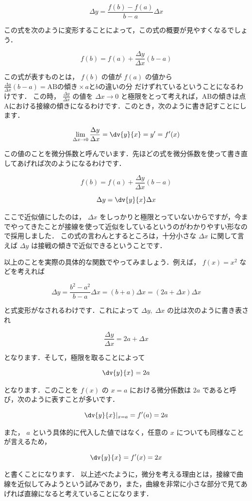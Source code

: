 \documentclass[
  letterpaper,
  DIV=11,
  numbers=noendperiod]{scrreprt}
\begin{document}
\[\Delta y = \frac{f(b)-f(a)}{b-a} \Delta x\]

この式を次のように変形することによって，この式の概要が見やすくなるでしょう．

\[ f(b) = f(a) + \frac{\Delta y}{\Delta x}(b-a) \]

この式が表すものとは， \(f(b)\) の値が \(f(a)\) の値から
\(\frac{\Delta y}{\Delta x}(b-a)=\text{ABの傾き}\times a\text{と}b\text{の違いの分}\)
だけずれているということになるわけです． この時，
\(\frac{\Delta y}{\Delta x}\) の値を \(\Delta x\to 0\)
と極限をとって考えれば，ABの傾きは点Aにおける接線の傾きになるわけです．このとき，次のように書き記すことにします．

\[\lim_{\Delta x \to 0}\frac{\Delta y}{\Delta x}=\dv{y}{x}=y'=f'(x)\]

この値のことを微分係数と呼んでいます．先ほどの式を微分係数を使って書き直してあげれば次のようになるわけです．

\[ f(b) = f(a) + \frac{\Delta y}{\Delta x}(b-a) \]

\[ \Delta y = \dv{y}{x} \Delta x\]

ここで近似値にしたのは， \(\Delta x\)
をしっかりと極限とっていないからですが，今までやってきたことが接線を使って近似をしているというのがわかりやすい形なので採用しました．
この式の言わんとするところは，十分小さな \(\Delta x\) に関して言えば
\(\Delta y\) は接戦の傾きで近似できるということです．

以上のことを実際の具体的な関数でやってみましょう．例えば， \(f(x)=x^2\)
などを考えれば

\[\Delta y = \frac{b^2-a^2}{b-a} \Delta x = (b+a) \Delta x = (2a+\Delta x) \Delta x\]

と式変形がなされるわけです．これによって \(\Delta y,\; \Delta x\)
の比は次のように書き表され

\[\frac{\Delta y}{\Delta x} = 2a + \Delta x\]

となります．そして，極限を取ることによって

\[\dv{y}{x}=2a\]

となります．このことを \(f(x)\) の \(x=a\) における微分係数は \(2a\)
であると呼び，次のように表すことが多いです．

\[ \dv{y}{x}|_{x=a}=f'(a)=2a\]

また， \(a\) という具体的に代入した値ではなく，任意の \(x\)
についても同様なことが言えるため，

\[ \dv{y}{x}=f'(x)=2x\]

と書くことになります．
以上述べたように，微分を考える理由とは，接線で曲線を近似してみようという試みであり，また，曲線を非常に小さな部分で見てあげれば直線になると考えていることになります．
\end{document}
